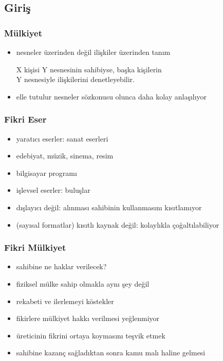 \documentclass[dvipsnames]{beamer}
\theoremstyle{definition}
\theoremstyle{example}
\theoremstyle{plain}
\begin{document}
\subsection{Giriş}

\begin{frame}
  \frametitle{Mülkiyet}

  \begin{itemize}
    \item nesneler üzerinden değil ilişkiler üzerinden tanım

    \medskip
    X kişisi Y nesnesinin sahibiyse, başka kişilerin\\
    Y nesnesiyle ilişkilerini denetleyebilir.

    \medskip
    \item elle tutulur nesneler sözkonusu olunca daha kolay anlaşılıyor
  \end{itemize}
\end{frame}

\begin{frame}
  \frametitle{Fikri Eser}

  \begin{itemize}
    \item yaratıcı eserler: sanat eserleri
    \item edebiyat, müzik, sinema, resim
    \item bilgisayar programı

    \medskip
    \item işlevsel eserler: buluşlar
  \end{itemize}

  \pause
  \bigskip
  \begin{itemize}
    \item dışlayıcı değil: alınması sahibinin kullanmasını kısıtlamıyor

    \medskip
    \item (sayısal formatlar) kısıtlı kaynak değil: kolaylıkla çoğaltılabiliyor
  \end{itemize}
\end{frame}

\begin{frame}
  \frametitle{Fikri Mülkiyet}

  \begin{itemize}
    \item sahibine ne haklar verilecek?
    \smallskip
    \item fiziksel mülke sahip olmakla aynı şey değil
    \item rekabeti ve ilerlemeyi köstekler

    \pause
    \bigskip
    \item fikirlere mülkiyet hakkı verilmesi yeğlenmiyor
    \smallskip
    \item üreticinin fikrini ortaya koymasını teşvik etmek
    \item sahibine kazanç sağladıktan sonra kamu malı haline gelmesi
  \end{itemize}
\end{frame}
\end{document}
